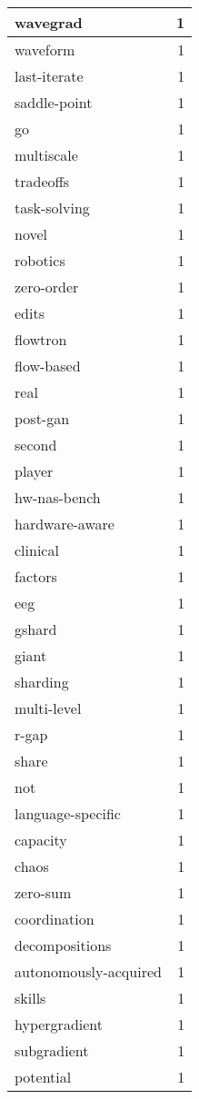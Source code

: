 \begin{table}[h]
\begin{tabular}{|l|r|}
\hline
wavegrad & 1 \\
\hline
waveform & 1 \\
\hline
last-iterate & 1 \\
\hline
saddle-point & 1 \\
\hline
go & 1 \\
\hline
multiscale & 1 \\
\hline
tradeoffs & 1 \\
\hline
task-solving & 1 \\
\hline
novel & 1 \\
\hline
robotics & 1 \\
\hline
zero-order & 1 \\
\hline
edits & 1 \\
\hline
flowtron & 1 \\
\hline
flow-based & 1 \\
\hline
real & 1 \\
\hline
post-gan & 1 \\
\hline
second & 1 \\
\hline
player & 1 \\
\hline
hw-nas-bench & 1 \\
\hline
hardware-aware & 1 \\
\hline
clinical & 1 \\
\hline
factors & 1 \\
\hline
eeg & 1 \\
\hline
gshard & 1 \\
\hline
giant & 1 \\
\hline
sharding & 1 \\
\hline
multi-level & 1 \\
\hline
r-gap & 1 \\
\hline
share & 1 \\
\hline
not & 1 \\
\hline
language-specific & 1 \\
\hline
capacity & 1 \\
\hline
chaos & 1 \\
\hline
zero-sum & 1 \\
\hline
coordination & 1 \\
\hline
decompositions & 1 \\
\hline
autonomously-acquired & 1 \\
\hline
skills & 1 \\
\hline
hypergradient & 1 \\
\hline
subgradient & 1 \\
\hline
potential & 1 \\

\end{tabular}
\end{table}
